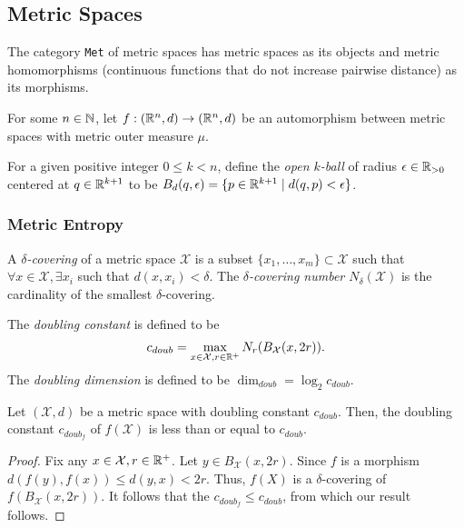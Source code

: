 \subsection{Metric Spaces}\label{sec:metric}
The category \texttt{Met} of metric spaces has metric spaces as its objects and metric homomorphisms (continuous functions that do not increase pairwise distance) as its morphisms.

For some $n\in\mathbb{N}$, let $f:(\mathbb{R}^n,d)\to(\mathbb{R}^n,d)$ be an automorphism between metric spaces with metric outer measure $\mu$.

\begin{definition}
For a given positive integer $0\le k<n$, define the \emph{open $k$-ball} of radius $\epsilon\in\mathbb{R}_{>0}$ centered at $q\in\mathbb{R}^{k+1}$ to be $B_d(q,\epsilon)=\{p\in\mathbb{R}^{k+1} \mid d(q,p)< \epsilon \}$.
\end{definition}

\subsubsection{Metric Entropy}
\begin{definition}
A \emph{$\delta$-covering} of a metric space $\mathcal{X}$ is a subset $\{x_1,\dots,x_m\}\subset \mathcal{X}$ such that $\forall x\in \mathcal{X}, \exists x_i$ such that $d(x,x_i)<\delta$. The \emph{$\delta$-covering number $N_\delta(\mathcal{X})$} is the cardinality of the smallest $\delta$-covering.
\end{definition}
\begin{definition}
The \emph{doubling constant} is defined to be $$c_{doub}=\max_{x\in\mathcal{X}, r\in\mathbb{R}^+} N_r(B_{\mathcal{X}}(x,2r)).$$
The \emph{doubling dimension} is defined to be $\dim_{doub}=\log_2 c_{doub}.$
\end{definition}

\begin{lemma}
Let $(\mathcal{X},d)$ be a metric space with doubling constant $c_{doub}$.
Then, the doubling constant $c_{doub_f}$ of $f(\mathcal{X})$ is less than or equal to $c_{doub}$.
\end{lemma}
\begin{proof}
Fix any $x\in\mathcal{X},r\in\mathbb{R}^+$.
Let $y\in B_{\mathcal{X}}(x,2r)$.
Since $f$ is a morphism $d(f(y),f(x))\le d(y,x)<2r$.
Thus, $f(X)$ is a $\delta$-covering of $f(B_{\mathcal{X}}(x,2r))$.
It follows that the $c_{doub_f}\le c_{doub}$, from which our result follows.
\end{proof}

